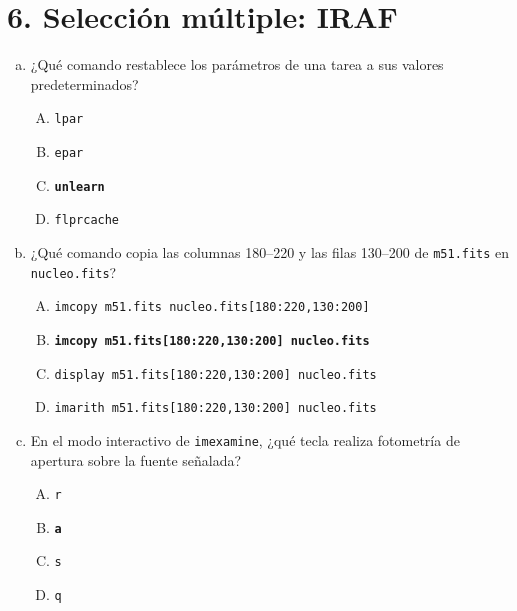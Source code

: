 \documentclass[a4paper,11pt]{article}
\newcommand{\correcta}[1]{\textcolor{red!70!black}{\textbf{#1}}}
\begin{document}
\section*{6. Selección múltiple: IRAF}

\begin{enumerate}[a)]
    \item ¿Qué comando restablece los parámetros de una tarea a sus valores predeterminados?
    \begin{enumerate}[A.]
        \item \texttt{lpar}
        \item \texttt{epar}
        \item \correcta{\texttt{unlearn}}
        \item \texttt{flprcache}
    \end{enumerate}

    \item ¿Qué comando copia las columnas 180--220 y las filas 130--200 de \texttt{m51.fits} en \texttt{nucleo.fits}?
    \begin{enumerate}[A.]
        \item \texttt{imcopy m51.fits nucleo.fits[180:220,130:200]}
        \item \correcta{\texttt{imcopy m51.fits[180:220,130:200] nucleo.fits}}
        \item \texttt{display m51.fits[180:220,130:200] nucleo.fits}
        \item \texttt{imarith m51.fits[180:220,130:200] nucleo.fits}
    \end{enumerate}

    \item En el modo interactivo de \texttt{imexamine}, ¿qué tecla realiza fotometría de apertura sobre la fuente señalada?
    \begin{enumerate}[A.]
        \item \texttt{r}
        \item \correcta{\texttt{a}}
        \item \texttt{s}
        \item \texttt{q}
    \end{enumerate}
\end{enumerate}
\end{document}
